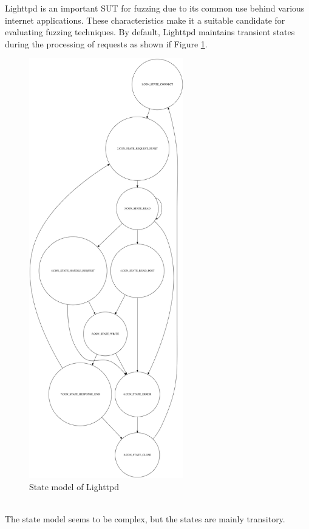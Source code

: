 Lighttpd is an important SUT for fuzzing due to its common use behind various internet applications.
These characteristics make it a suitable candidate for evaluating fuzzing techniques.
By default, Lighttpd maintains transient states during the processing of requests  as shown if Figure \ref{fig:lighttpdstatemodel}.
\begin{figure}[H]
    \centering
    \includegraphics[width=0.6\textwidth]{Images/lighttpd_original.png}
    \caption{State model of Lighttpd}
    \label{fig:lighttpdstatemodel}
\end{figure}
\phantom{}\\
The state model seems to be complex, but the states are mainly transitory.
